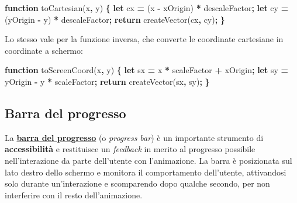 \documentclass[
]{book}
\newenvironment{Shaded}{\begin{snugshade}}{\end{snugshade}}
\newcommand{\AttributeTok}[1]{\textcolor[rgb]{0.77,0.63,0.00}{#1}}
\newcommand{\ControlFlowTok}[1]{\textcolor[rgb]{0.13,0.29,0.53}{\textbf{#1}}}
\newcommand{\KeywordTok}[1]{\textcolor[rgb]{0.13,0.29,0.53}{\textbf{#1}}}
\newcommand{\NormalTok}[1]{#1}
\newcommand{\OperatorTok}[1]{\textcolor[rgb]{0.81,0.36,0.00}{\textbf{#1}}}
\begin{document}
\begin{Shaded}
\begin{Highlighting}[]
\KeywordTok{function} \AttributeTok{toCartesian}\NormalTok{(x}\OperatorTok{,}\NormalTok{ y) }\OperatorTok{\{}
  \KeywordTok{let}\NormalTok{ cx }\OperatorTok{=}\NormalTok{ (x }\OperatorTok{-}\NormalTok{ xOrigin) }\OperatorTok{*}\NormalTok{ descaleFactor}\OperatorTok{;}
  \KeywordTok{let}\NormalTok{ cy }\OperatorTok{=}\NormalTok{ (yOrigin }\OperatorTok{-}\NormalTok{ y) }\OperatorTok{*}\NormalTok{ descaleFactor}\OperatorTok{;}
  \ControlFlowTok{return} \AttributeTok{createVector}\NormalTok{(cx}\OperatorTok{,}\NormalTok{ cy)}\OperatorTok{;}
\OperatorTok{\}}
\end{Highlighting}
\end{Shaded}

Lo stesso vale per la funzione inversa, che converte le coordinate cartesiane in coordinate a schermo:

\begin{Shaded}
\begin{Highlighting}[]
\KeywordTok{function} \AttributeTok{toScreenCoord}\NormalTok{(x}\OperatorTok{,}\NormalTok{ y) }\OperatorTok{\{}
  \KeywordTok{let}\NormalTok{ sx }\OperatorTok{=}\NormalTok{ x }\OperatorTok{*}\NormalTok{ scaleFactor }\OperatorTok{+}\NormalTok{ xOrigin}\OperatorTok{;}
  \KeywordTok{let}\NormalTok{ sy }\OperatorTok{=}\NormalTok{ yOrigin }\OperatorTok{-}\NormalTok{ y }\OperatorTok{*}\NormalTok{ scaleFactor}\OperatorTok{;}
  \ControlFlowTok{return} \AttributeTok{createVector}\NormalTok{(sx}\OperatorTok{,}\NormalTok{ sy)}\OperatorTok{;}
\OperatorTok{\}}
\end{Highlighting}
\end{Shaded}

\hypertarget{progrbar}{%
\subsection{Barra del progresso}\label{progrbar}}

La \href{https://github.com/Bradwave/thesis/blob/master/animations/js/utils/progressGraphics.js}{\textbf{barra del progresso}} (o \emph{progress bar}) è un importante strumento di \textbf{accessibilità} e restituisce un \emph{feedback} in merito al progresso possibile nell'interazione da parte dell'utente con l'animazione. La barra è posizionata sul lato destro dello schermo e monitora il comportamento dell'utente, attivandosi solo durante un'interazione e scomparendo dopo qualche secondo, per non interferire con il resto dell'animazione.
\end{document}
